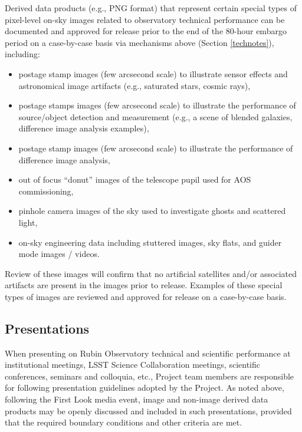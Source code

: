 \documentclass[SE,authoryear,toc]{lsstdoc}
\begin{document}
Derived data products (e.g., PNG format) that represent certain special types of pixel-level on-sky images related to observatory technical performance can be documented and approved for release prior to the end of the 80-hour embargo period on a case-by-case basis via mechanisms above (Section \ref{technotes}), including:

\begin{itemize}

  \item postage stamp images (few arcsecond scale) to illustrate sensor effects and astronomical image artifacts (e.g., saturated stars, cosmic rays),

  \item postage stamps images (few arcsecond scale) to illustrate the performance of source/object detection and measurement (e.g., a scene of blended galaxies, difference image analysis examples),

  \item postage stamp images (few arcsecond scale) to illustrate the performance of difference image analysis,

  \item out of focus ``donut'' images of the telescope pupil used for AOS commissioning,

  \item pinhole camera images of the sky used to investigate ghosts and scattered light,

  \item on-sky engineering data including stuttered images, sky flats, and guider mode images / videos.

\end{itemize}

Review of these images will confirm that no artificial satellites and/or associated artifacts are present in the images prior to release.
Examples of these special types of images are reviewed and approved for release on a case-by-case basis.

\subsection{Presentations}

When presenting on Rubin Observatory technical and scientific performance at institutional meetings, LSST Science Collaboration meetings, scientific conferences, seminars and colloquia, etc., Project team members are responsible for following presentation guidelines adopted by the Project.
As noted above, following the First Look media event, image and non-image derived data products may be openly discussed and included in such presentations, provided that the required boundary conditions and other criteria are met.
\end{document}
